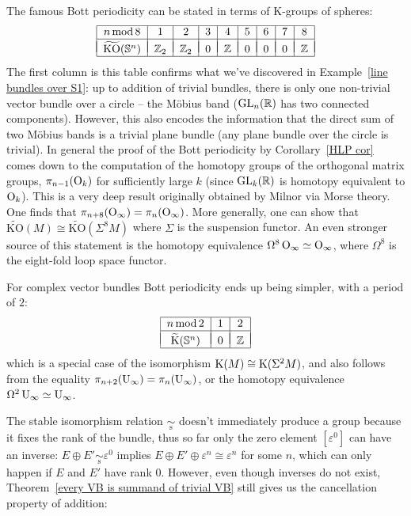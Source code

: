 \begin{example}
The famous Bott periodicity can be stated in terms of K-groups of spheres:
\[\begin{tabular}{|c|c|c|c|c|c|c|c|c|}
\hline 
$n\,\mathrm{mod}\,8$ & 1 & 2 & 3 & 4 & 5 & 6 & 7 & 8\tabularnewline
\hline &&&&&&&&\\[-1em]
$\widetilde{\mathrm{KO}}(\bbS^{n})$ & $\bbZ_{2}$ & $\bbZ_{2}$ & $0$ & $\bbZ$ & $0$ & $0$ & $0$ & $\bbZ$\tabularnewline
\hline 
\end{tabular}\]
The first column is this table confirms what we've discovered in Example~\ref{line bundles over S1}: up to addition of trivial bundles, there is only one non-trivial vector bundle over a circle -- the M\"obius band ($\operatorname{GL}_n(\mathbb{R})$ has two connected components). However, this also encodes the information that the direct sum of two M\"obius bands is a trivial plane bundle (any plane bundle over the circle is trivial). In general the proof of the Bott periodicity by Corollary~\ref{HLP cor} comes down to the computation of the homotopy groups of the orthogonal matrix groups, $\pi_{n-1}(\operatorname{O}_k)$ for sufficiently large $k$ (since $\operatorname{GL}_k(\mathbb{R})$ is homotopy equivalent to $\operatorname{O}_k$). This is a very deep result originally obtained by Milnor via Morse theory. One finds that $\pi_{n+8}(\operatorname{O}_\infty)=\pi_n(\operatorname{O}_\infty)$. More generally, one can show that $\widetilde{\mathrm{KO}}(M)\cong \widetilde{\mathrm{KO}}(\Sigma^8 M)$ where $\Sigma$ is the suspension functor. An even stronger source of this statement is the homotopy equivalence $\Omega^8\operatorname{O}_\infty\simeq \operatorname{O}_\infty$, where $\Omega^8$ is the eight-fold loop space functor.

For complex vector bundles Bott periodicity ends up being simpler, with a period of $2$:
\[\begin{tabular}{|c|c|c|}
\hline 
$n\,\mathrm{mod}\,2$ & 1 & 2 \tabularnewline
\hline &&\\[-1em]
$\widetilde{\rmK}(\bbS^{n})$ & $0$ & $\bbZ$ \tabularnewline
\hline 
\end{tabular}\]
which is a special case of the isomorphism $\mathrm{K}(M)\cong \mathrm{K}(\Sigma^2 M)$, and also follows from the equality $\pi_{n+2}(\operatorname{U}_\infty)=\pi_n(\operatorname{U}_\infty)$, or the homotopy equivalence $\Omega^2 \operatorname{U}_\infty\simeq \operatorname{U}_\infty$.
\end{example}


The stable isomorphism relation $\underset{\mathrm{s}}{\sim}$ doesn't immediately produce a group because it fixes the rank of the bundle, thus so far only the zero element $[\varepsilon^0]$ can have an inverse: $E\oplus E'\underset{\mathrm{s}}{\sim}\varepsilon^0$ implies $E\oplus E'\oplus \varepsilon^n\cong \varepsilon^n$ for some $n$, which can only happen if $E$ and $E'$ have rank $0$. However, even though inverses do not exist, Theorem~\ref{every VB is summand of trivial VB} still gives us the cancellation property of addition:

